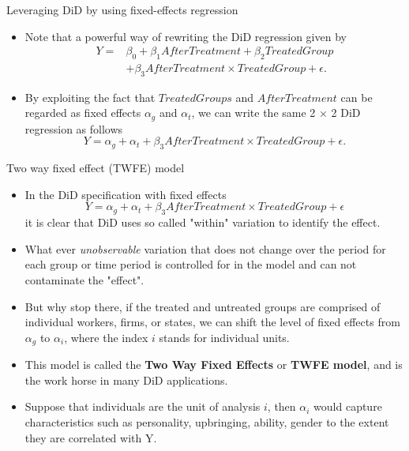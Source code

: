 \documentclass[notes,11pt, aspectratio=169]{beamer}
\begin{document}
\begin{frame}{Leveraging DiD by using fixed-effects regression}
\begin{itemize} 
\item Note that a powerful way of rewriting the DiD regression given by
\begin{align}
Y = &\beta_0 + \beta_1 AfterTreatment + \beta_2 TreatedGroup\\ \nonumber
&+ \beta_3 AfterTreatment \times TreatedGroup + \epsilon.
\end{align}
\item By exploiting the fact that $TreatedGroups$ and $AfterTreatment$ can be regarded as fixed effects $\alpha_g$ and $\alpha_{t}$, we can write the same 2 × 2 DiD regression as follows 
\begin{equation}
Y = \alpha_g + \alpha_{t} + \beta_3 AfterTreatment \times TreatedGroup + \epsilon.
\end{equation}
\end{itemize}
\end{frame}

\begin{frame}{Two way fixed effect (TWFE) model }
\begin{itemize}
\item In the DiD specification with fixed effects 
\begin{equation}
Y = \alpha_g + \alpha_{t} + \beta_3 AfterTreatment \times TreatedGroup + \epsilon
\end{equation}
it is clear that DiD uses so called "within" variation to identify the effect. 
\item What ever \emph{unobservable} variation that does not change over the period for each group or time period is controlled for in the model and can not contaminate the "effect".    
\item But why stop there, if the treated and untreated groups are comprised of individual workers, firms, or states, we can shift the level of fixed effects from $\alpha_g$ to $\alpha_i$, where the index $i$ stands for individual units.  
\item This model is called the \textbf{Two Way Fixed Effects} or \textbf{TWFE model}, and is the work horse in many DiD applications.
\item Suppose that individuals are the unit of analysis $i$, then $\alpha_i$ would capture characteristics such as personality, upbringing, ability, gender to the extent they are correlated with Y.
\end{itemize}
\end{frame}
\end{document}
